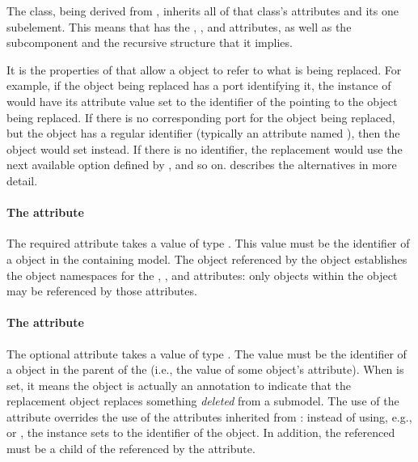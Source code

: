 The \ReplacedElement class, being derived from \SBaseRef, inherits all
of that class's attributes and its one subelement.  This means that
\ReplacedElement has the , , 
and  attributes, as well as the subcomponent
 and the recursive structure that it implies.

It is the properties of \SBaseRef that allow a \ReplacedElement object
to refer to what is being replaced.  For example, if the object being
replaced has a port identifying it, the instance of \ReplacedElement
would have its  attribute value set to the identifier of
the \Port pointing to the object being replaced.  If there is no
corresponding port for the object being replaced, but the object has a
regular identifier (typically an attribute named ), then the
\ReplacedElement object would set  instead.  If there is no
identifier, the replacement would use the next available option defined
by \SBaseRef, and so on.   describes the
alternatives in more detail.


\paragraph{The \fixttspace{} attribute}
\label{replacedelement-submodelref}

The required attribute  takes a value of type
.  This value must be the identifier of a \Submodel
object in the containing model.  The \Model object referenced by the
\Submodel object establishes the object namespaces for the
, ,  and 
attributes: only objects within the \Model object may be referenced by
those attributes.


\paragraph{The \fixttspace{} attribute}
\label{replacedelement-deletion}

The optional attribute  takes a value of type
.  The value must be the identifier of a \Deletion
object in the parent \Model of the \ReplacedElement (i.e., the value of
some \Deletion object's  attribute).  When  is
set, it means the \ReplacedElement object is actually an annotation to
indicate that the replacement object replaces something \emph{deleted}
from a submodel.  The use of the  attribute overrides
the use of the attributes inherited from \SBaseRef: instead of using,
e.g.,  or , the \ReplacedElement instance
sets  to the identifier of the \Deletion object.  In
addition, the referenced \Deletion must be a child of the \Submodel
referenced by the  attribute.

